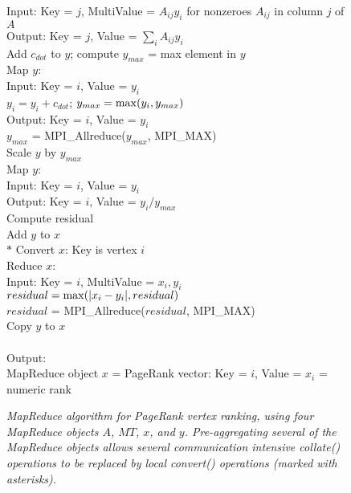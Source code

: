 \begin{figure}[htb]
\begin{center}
{\begin{minipage}{\textwidth}
\begin{tabbing}
\> \> \> Input: Key = $j$, MultiValue = $A_{ij} y_i$ for nonzeroes $A_{ij}$ in column $j$ of $A$ \\
\> \> \> Output: Key = $j$, Value = $\sum_i A_{ij} y_i$ \\
 Add $c_{dot}$ to $y$; compute $y_{max}$ = max element in $y$ \\
\> \> Map $y$:  \\
\> \> \> Input: Key = $i$, Value = $y_i$ \\
\> \> \> $y_i = y_i + c_{dot}$; $y_{max} = {\rm max}(y_i,y_{max})$ \\
\> \> \> Output:  Key = $i$, Value = $y_i$ \\
\> \> $y_{max}$ = MPI\_Allreduce($y_{max}$, MPI\_MAX) \\
 Scale $y$ by $y_{max}$ \\
\> \> Map $y$: \\
\> \> \> Input:  Key = $i$, Value = $y_i$ \\
\> \> \> Output:  Key = $i$, Value = $y_i / y_{max}$ \\
 Compute residual \\
\> \> Add $y$ to $x$ \\
$*$\> \> Convert $x$:  Key is vertex $i$ \\
\> \> Reduce $x$:  \\
\> \> \> Input: Key = $i$, MultiValue = $x_i, y_i$ \\
\> \> \> $residual = {\rm max}(|x_i - y_i|,residual)$ \\
\> \> $residual$ = MPI\_Allreduce($residual$, MPI\_MAX) \\
 Copy $y$ to $x$ \\
\\
Output: \\
\> MapReduce object $x$ = PageRank vector: Key = $i$, Value = $x_i$ = numeric rank 
  \end{tabbing}
 \end{minipage}}\end{center}

 \caption{\it MapReduce algorithm for PageRank vertex ranking, using four
 MapReduce objects $A$, $MT$, $x$, and $y$.  Pre-aggregating several
 of the MapReduce objects allows several communication intensive {\it
 collate()} operations to be replaced by local {\it convert()}
 operations (marked with asterisks).}

 \label{fig:pr2}
\end{figure}

